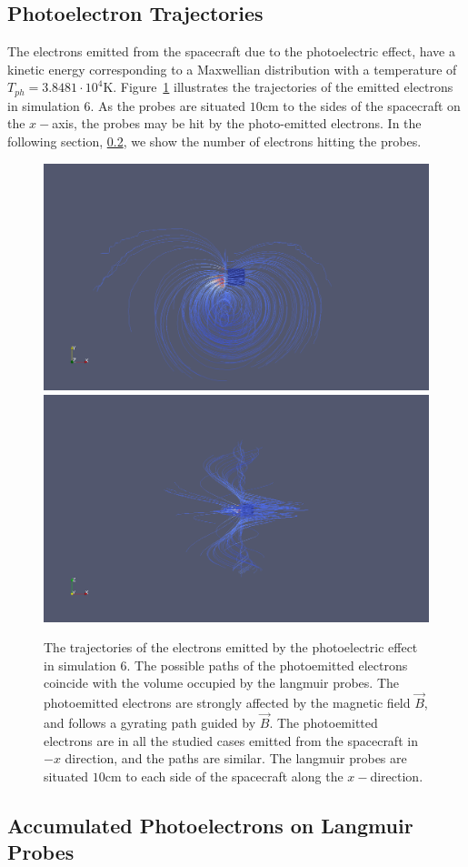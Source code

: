 \subsection{Photoelectron Trajectories}

	The electrons emitted from the spacecraft due to the photoelectric effect, have a kinetic
	energy corresponding to a Maxwellian distribution with a temperature of \(T_{ph} =  3.8481\cdot 10^{4} \text{K}\).
	Figure~\ref{fig:trajectories} illustrates the trajectories of the emitted electrons in simulation \(6\).
	As the probes are situated \(10 \text{cm}\) to the sides of the spacecraft on the \(x-\)axis, the probes
	may be hit by the photo-emitted electrons. In the following section, \ref{sec:acc_emitted}, we show the number of electrons hitting
	the probes.


	\begin{figure}
		\includegraphics[width = 0.49 \textwidth]{images/case6_jph_paths}
		\includegraphics[width = 0.49 \textwidth]{images/case6_jph_paths_2}
		\caption{The trajectories of the electrons emitted by the photoelectric effect in simulation \(6\). The possible
		paths of the photoemitted electrons coincide with the volume occupied by the langmuir probes. The photoemitted electrons are strongly affected by the magnetic
		field \(\vec{B}\), and follows a gyrating path guided by \(\vec{B}\). The photoemitted electrons are in all the studied cases
		emitted from the spacecraft in \(-x\) direction, and the paths are similar. The langmuir probes are situated \(10 \text{cm}\) to each side
		of the spacecraft along the \(x-\)direction.}
		\label{fig:trajectories}
	\end{figure}

\subsection{Accumulated Photoelectrons on Langmuir Probes}
\label{sec:acc_emitted}

